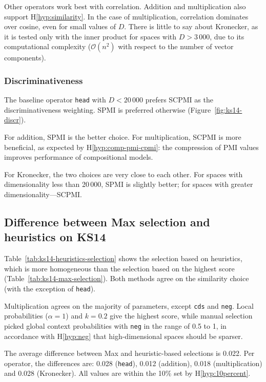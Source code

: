 Other operators work best with correlation. Addition and multiplication also support H\ref{hyp:similarity}. In the case of multiplication, correlation dominates over cosine, even for small values of $D$. There is little to say about Kronecker, as it is tested only with the inner product for spaces with $D > 3\,000$, due to its computational complexity ($\mathcal{O}(n^2)$ with respect to the number of vector components).

\subsubsection{Discriminativeness}


The baseline operator \texttt{head} with $D < 20\,000$ prefers SCPMI as the discriminativeness weighting. SPMI is preferred otherwise (Figure~\ref{fig:ks14-discr}).

For addition, SPMI is the better choice. For multiplication, SCPMI is more beneficial, as expected by H\ref{hyp:comp-pmi-cpmi}: the compression of PMI values improves performance of compositional models.

For Kronecker, the two choices are very close to each other. For spaces with dimensionality less than 20\,000, SPMI is slightly better; for spaces with greater dimensionality---SCPMI.

\subsection{Difference between Max selection and heuristics on KS14}

Table~\ref{tab:ks14-heuristics-selection} shows the selection based on heuristics, which is more homogeneous than the selection based on the highest score (Table~\ref{tab:ks14-max-selection}). Both methods agree on the similarity choice (with the exception of \texttt{head}).

Multiplication agrees on the majority of parameters, except \texttt{cds} and \texttt{neg}. Local probabilities ($\alpha = 1$) and $k = 0.2$ give the highest score, while manual selection picked global context probabilities with \texttt{neg} in the range of 0.5 to 1, in accordance with H\ref{hyp:neg} that high-dimensional spaces should be sparser.

The average difference between Max and heuristic-based selections is 0.022. Per operator, the differences are: 0.028 (\texttt{head}), 0.012 (addition), 0.018 (multiplication) and 0.028 (Kronecker). All values are within the 10\% set by H\ref{hyp:10percent}.

